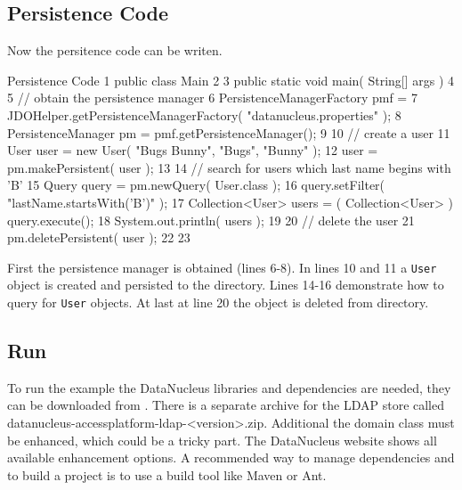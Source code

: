 \documentclass[a4paper,11pt,oneside]{article}
\begin{document}
\subsection{Persistence Code}
Now the persitence code can be writen.

\begin{SaveVerbatim}{Persistence Code}
 1  public class Main
 2  {
 3      public static void main( String[] args )
 4      {
 5          // obtain the persistence manager
 6          PersistenceManagerFactory pmf = 
 7                JDOHelper.getPersistenceManagerFactory( "datanucleus.properties" );
 8          PersistenceManager pm = pmf.getPersistenceManager();
 9  
10          // create a user
11          User user = new User( "Bugs Bunny", "Bugs", "Bunny" );
12          user = pm.makePersistent( user );
13  
14          // search for users which last name begins with 'B'
15          Query query = pm.newQuery( User.class );
16          query.setFilter( "lastName.startsWith('B')" );
17          Collection<User> users = ( Collection<User> ) query.execute();
18          System.out.println( users );
19  
20          // delete the user
21          pm.deletePersistent( user );
22      }
23  }
\end{SaveVerbatim}
\begin{figure}[htb]
\end{figure}

First the persistence manager is obtained (lines 6-8). In lines 10 and 11 a \texttt{User} object is created and persisted to the directory. Lines 14-16 demonstrate how to query for \texttt{User} objects. At last at line 20 the object is deleted from directory.

\subsection{Run}

To run the example the DataNucleus libraries and dependencies are needed, they can be downloaded from \cite{DataNucleus Downlaod}. There is a separate archive for the LDAP store called datanucleus-accessplatform-ldap-<version>.zip. Additional the domain class must be enhanced, which could be a tricky part. The DataNucleus website \cite{DataNucleus Enhancer} shows all available enhancement options. A recommended way to manage dependencies and to build a project is to use a build tool like Maven or Ant.
\end{document}
